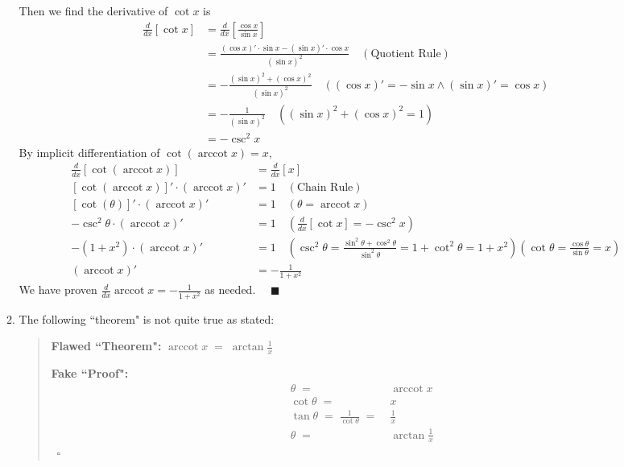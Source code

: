 \documentclass[12pt]{exam}
\newcommand {\DS} [1] {${\displaystyle #1}$}
\DeclareMathOperator{\arccot}{arccot}
\begin{document}
\begin{enumerate}
\begin{enumerate}
		Then we find the derivative of $\cot x$ is
		\begin{align*}
		    \frac{d}{dx}[\cot x]&=\frac{d}{dx}[\frac{\cos x}{\sin x}]\\
		    &=\frac{(\cos x)'\cdot\sin x-(\sin x)'\cdot\cos x}{(\sin x)^2}\quad(\mbox{Quotient Rule})\\
		    &=-\frac{(\sin x)^2+(\cos x)^2}{(\sin x)^2}\quad((\cos x)'=-\sin x \land (\sin x)'=\cos x)\\
		    &=-\frac{1}{(\sin x)^2}\quad((\sin x)^2+(\cos x)^2=1)\\
		    &=-\csc^2 x
		\end{align*}
		By implicit differentiation of $\cot(\arccot x)=x,$
		\begin{align*}
		    \frac{d}{dx}[\cot(\arccot x)]&=\frac{d}{dx}[x]\\
		    [\cot(\arccot x)]'\cdot (\arccot x)'&=1\quad(\mbox{Chain Rule})\\
		    [\cot(\theta)]'\cdot (\arccot x)'&=1\quad(\theta=\arccot{x})\\
		    -\csc^2\theta\cdot(\arccot x)'&=1\quad(\frac{d}{dx}[\cot x]=-\csc^2 x)\\
		    -(1+x^2)\cdot(\arccot x)'&=1\quad(\csc^2\theta=\frac{\sin^2\theta+\cos^2\theta}{\sin^2\theta}=1+\cot^2\theta=1+x^2)(\cot\theta=\frac{\cos\theta}{\sin\theta}=x)\\
		    (\arccot x)'&=-\frac{1}{1+x^2}
		\end{align*}
		We have proven $\frac{d}{dx} \arccot x=-\frac{1}{1+x^2}$ as needed. $\quad\blacksquare$

\newpage

		\item The following ``theorem" is not quite true as stated:
		
			\begin{quotation}
			{\bf Flawed ``Theorem":}   \DS{ \arccot x \; = \; \arctan \frac{1}{x} }
			
			{\bf Fake ``Proof":}   \vspace{-.5cm}
				\begin{align*}
					\theta \; =& \; \arccot x \\
					 \cot \theta \; =& \;  x \\
					 \tan \theta \; = \; \frac{1}{\cot \theta} \; =& \; \frac{1}{x} \\
					 \theta  \; =& \;  \arctan \frac{1}{x}  
				\end{align*}
				\ \hfill $\square$
			\end{quotation}


\end{enumerate}
\end{enumerate}
\end{document}
